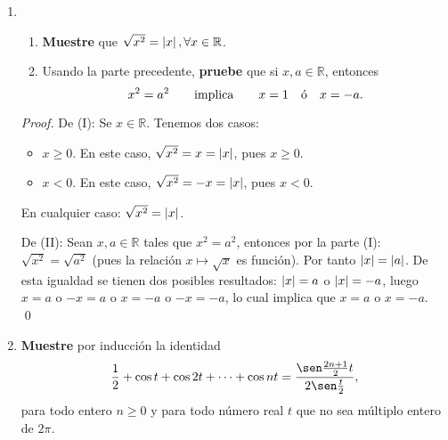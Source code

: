 \documentclass[12pt]{article}
\begin{document}
\begin{enumerate}
\begin{proof}
        para toda $n\in\mathbb{N}$. De esta forma se debe tener:
        \begin{equation*}
            x^n-y^n>0
        \end{equation*}
        $\left(\Leftarrow\right)$ Procederemos probando la contrapositiva, es decir, $x\leq y\Rightarrow x^n\leq y^n$, para toda $n\in\mathbb{N}$. Suponga que $x\leq y$, entonces $x-y\leq0$. Como $x,y>0$, entonces el término
        \begin{equation*}
            \left(x^{n-1}+x^{n-2}y+\cdots+xy^{n-2}+y^{n-1}\right)>0    
        \end{equation*}
        para toda $n\in\mathbb{N}$. Por tanto:
        \begin{equation*}
            x^n-y^n\leq 0
        \end{equation*}
        \qed
    \end{proof}
    \item \begin{enumerate}
        \item \textbf{Muestre} que $\sqrt{x^2}=\left| x \right|,\forall x\in\mathbb{R}$.
        \item Usando la parte precedente, \textbf{pruebe} que si $x,a\in\mathbb{R}$, entonces
        \begin{equation*}
            x^2=a^2 \qquad \textup{implica} \qquad x=1 \quad \textup{ó} \quad x=-a.
        \end{equation*}
    \end{enumerate}
    \begin{proof}
        De (I): Se $x\in\mathbb{R}$. Tenemos dos casos:
        \begin{itemize}
            \item $x\geq0$. En este caso, $\sqrt{x^2}=x=\left| x \right|$, pues $x\geq0$.
            \item $x<0$. En este caso, $\sqrt{x^2}=-x=\left| x \right|$, pues $x<0$.
        \end{itemize}
        En cualquier caso: $\sqrt{x^2}=\left| x \right|$.
        
        De (II): Sean $x,a\in\mathbb{R}$ tales que $x^2=a^2$, entonces por la parte (I): $\sqrt{x^2}=\sqrt{a^2}$ (pues la relación $x\longmapsto \sqrt{x}$ es función). Por tanto $\left| x \right|=\left| a \right|$.
        De esta igualdad se tienen dos posibles resultados: $\left| x \right|=a$ o $\left| x \right|=-a$, luego $x=a$ o $-x=a$ o $x=-a$ o $-x=-a$, lo cual implica que $x=a$ o $x=-a$.
        \qed
    \end{proof}
    \item \textbf{Muestre} por inducción la identidad
    \begin{equation*}
        \frac{1}{2}+\cos t +\cos 2t +\cdots+\cos nt = \frac{\sen \frac{2n+1}{2}t}{2\sen \frac{t}{2}},
    \end{equation*}
    para todo entero $n\geq0$ y para todo número real $t$ que no sea múltiplo entero de $2\pi$.
    

\end{enumerate}
\end{document}
